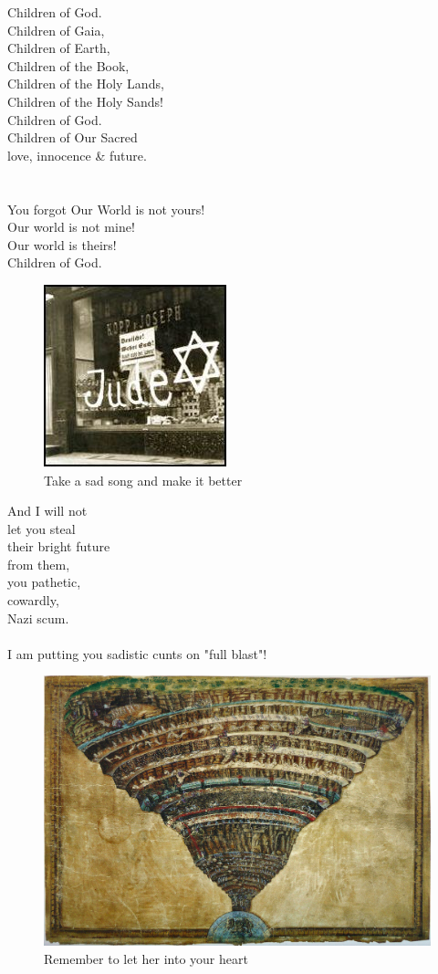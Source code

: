 \documentclass[16pt,openany,oneside]{book}
\begin{document}
\noindent  Children of God. \\ 
Children of Gaia, \\ 
Children of Earth, \\ 
Children of the Book, \\ 
Children of the Holy Lands, \\
Children of the Holy Sands! \\
Children of God. \\
Children of Our Sacred \\
love, innocence \& future. \\       
\\\\
\noindent You forgot Our World is not yours! \\
Our world is not mine! \\
Our world is theirs! \\
Children of God.

\begin{figure}[H]
    \centering
    \includegraphics{assets/jude.jpg}
    \caption{Take a sad song and make it better}
    \label{fig:jude-storefront}
\end{figure}

\noindent And I will not \\ 
let you steal \\ 
their bright future \\ 
from them, \\
you pathetic, \\ 
cowardly, \\ 
Nazi scum.
\\\\
I am putting you sadistic cunts on "full blast"!

\begin{figure}[H]
    \centering
    \includegraphics[width=0.5\linewidth]{assets/inferno.jpg}
    \caption{Remember to let her into your heart}
    \label{fig:dante-inferno}
\end{figure}
\end{document}

